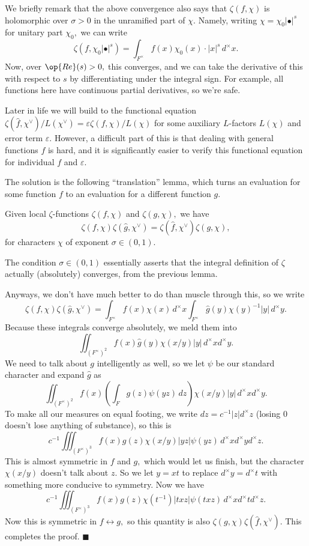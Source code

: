 We briefly remark that the above convergence also says that $\zeta(f,\chi)$ is holomorphic over $\sigma>0$ in the unramified part of $\chi.$ Namely, writing $\chi=\chi_0|\bullet|^s$ for unitary part $\chi_0,$ we can write
\[\zeta(f,\chi_0|\bullet|^s)=\int_{F^\times}f(x)\chi_0(x)\cdot|x|^s\,d^\times x.\]
Now, over $\op{Re}(s)>0,$ this converges, and we can take the derivative of this with respect to $s$ by differentiating under the integral sign. For example, all functions here have continuous partial derivatives, so we're safe.

Later in life we will build to the functional equation $\zeta(\hat f,\chi^\vee)/L(\chi^\vee)=\varepsilon\zeta(f,\chi)/L(\chi)$ for some auxiliary $L$-factors $L(\chi)$ and error term $\varepsilon.$ However, a difficult part of this is that dealing with general functions $f$ is hard, and it is significantly easier to verify this functional equation for individual $f$ and $\varepsilon.$

The solution is the following ``translation'' lemma, which turns an evaluation for some function $f$ to an evaluation for a different function $g.$
\begin{lemma}
    Given local $\zeta$-functions $\zeta(f,\chi)$ and $\zeta(g,\chi),$ we have
    \[\zeta(f,\chi)\zeta(\hat g,\chi^\vee)=\zeta(\hat f,\chi^\vee)\zeta(g,\chi),\]
    for characters $\chi$ of exponent $\sigma\in(0,1).$
\end{lemma}
The condition $\sigma\in(0,1)$ essentially asserts that the integral definition of $\zeta$ actually (absolutely) converges, from the previous lemma.

Anyways, we don't have much better to do than muscle through this, so we write
\[\zeta(f,\chi)\zeta(\hat g,\chi^\vee)=\int_{F^\times}f(x)\chi(x)\,d^\times x\int_{F^\times}\hat g(y)\chi(y)^{-1}|y|\,d^\times y.\]
Because these integrals converge absolutely, we meld them into
\[\iint_{(F^\times)^2}f(x)\hat g(y)\chi(x/y)|y|\,d^\times xd^\times y.\]
We need to talk about $g$ intelligently as well, so we let $\psi$ be our standard character and expand $\hat g$ as
\[\iint_{(F^\times)^2}f(x)\left(\int_Fg(z)\psi(yz)\,dz\right)\chi(x/y)|y|\,d^\times xd^\times y.\]
To make all our measures on equal footing, we write $dz=c^{-1}|z|d^\times z$ (losing $0$ doesn't lose anything of substance), so this is
\[c^{-1}\iiint_{(F^\times)^3}f(x)g(z)\chi(x/y)|yz|\psi(yz)\,d^\times xd^\times yd^\times z.\]
This is almost symmetric in $f$ and $g,$ which would let us finish, but the character $\chi(x/y)$ doesn't talk about $z.$ So we let $y=xt$ to replace $d^\times y=d^\times t$ with something more conducive to symmetry. Now we have
\[c^{-1}\iiint_{(F^\times)^3}f(x)g(z)\chi(t^{-1})|txz|\psi(txz)\,d^\times xd^\times td^\times z.\]
Now this is symmetric in $f\leftrightarrow g,$ so this quantity is also $\zeta(g,\chi)\zeta(\hat f,\chi^\vee).$ This completes the proof. $\blacksquare$

